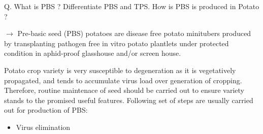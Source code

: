 \documentclass[
  openany]{book}
\providecommand{\tightlist}{%
  \setlength{\itemsep}{0pt}\setlength{\parskip}{0pt}}
\begin{document}
Q. What is PBS ? Differentiate PBS and TPS. How is PBS is produced in Potato ?

\(\longrightarrow\) Pre-basic seed (PBS) potatoes are disease free potato minitubers produced by transplanting pathogen free in vitro potato plantlets under protected condition in aphid-proof glasshouse and/or screen house.

Potato crop variety is very susceptible to degeneration as it is vegetatively propagated, and tends to accumulate virus load over generation of cropping. Therefore, routine maintenace of seed should be carried out to ensure variety stands to the promised useful features. Following set of steps are usually carried out for production of PBS:

\begin{itemize}
\tightlist
\item
  Virus elimination


\end{itemize}
\end{document}
